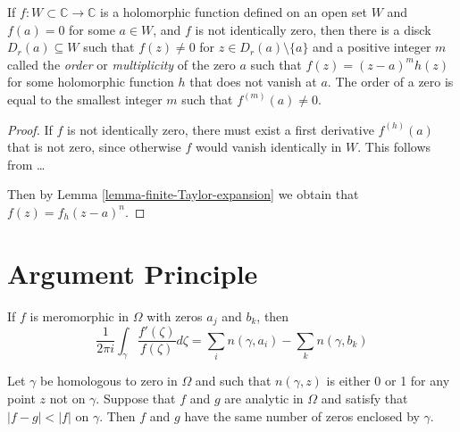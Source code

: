 \begin{theorem}
\label{theorem-zeroes-are-isolated-and-have-finite-order}
If $f:W\subset\mathbb{C}\to \mathbb{C}$ is a holomorphic function defined on an
open set $W$ and $f(a)=0$ for some $a\in W$, and $f$ is not identically zero,
then there is a disck $D_r(a)\subseteq W$ such that $f(z)\neq 0$ for $z \in
D_r(a)\setminus\{a\}$ and a positive integer $m$ called the {\it order} or
{\it multiplicity} of the zero $a$ such that  $f(z)=(z-a)^mh(z)$ for some
holomorphic function $h$ that does not vanish at $a$. The order of a zero is
equal to the smallest integer $m$ such that $f^{(m)}(a)\neq 0$.
\end{theorem}

\begin{proof}
If $f$ is not identically zero, there must exist a first derivative $f^{
(h)}(a)$ that is not zero, since otherwise $f$ would vanish identically in $W$.
This follows from … 

Then by Lemma \ref{lemma-finite-Taylor-expansion} we obtain that
$f(z)=f_h(z-a)^n$.
\end{proof}

\section{Argument Principle}
\label{section-argument-principle}

\begin{theorem}
\label{theorem-argument-principle-and-Rouche-theorem}
\begin{reference}
\cite[Chapter 5, Theorem 18]{ahl}
\end{reference}
If $f$ is meromorphic in $\Omega$ with zeros $a_j$ and $b_k$, then
\begin{equation}
\label{equation-argument-principle}
\frac{1}{2\pi i}\int_\gamma\frac{f'(\zeta)}{f(\zeta)}d\zeta
=\sum_{i}n(\gamma,a_i)-\sum_{k}n(\gamma,b_k)
\end{equation}
\end{theorem}

\begin{lemma}
\label{lemma-Rouche-theorem}
\begin{reference}
\cite[Chapter 5, Corollary, p. 153]{ahl}
\end{reference}
Let $\gamma$ be homologous to zero in $\Omega$ and such that $n(\gamma,z)$ is
either 0 or 1 for any point $z$ not on $\gamma$. Suppose that $f$ and $g$ are
analytic in $\Omega$ and satisfy that $|f-g|<|f|$ on $\gamma$. Then $f$ and $g$
have the same number of zeros enclosed by $\gamma$.
\end{lemma}

